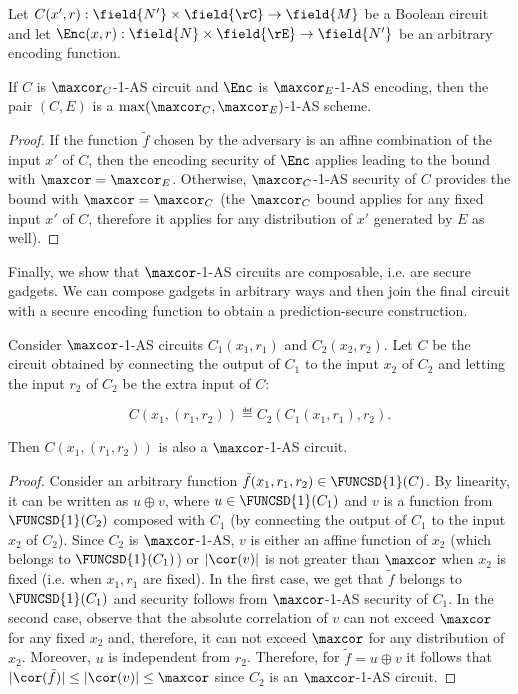 \begin{proposition}
Let $C(x',r): \field{N'} \times \field{\rC} \to \field{M}$ be a Boolean circuit and
let $\Enc(x,r): \field{N} \times \field{\rE} \to \field{N'}$ be an arbitrary encoding function.

If $C$ is $\maxcor_C$-1-AS circuit and $\Enc$ is $\maxcor_E$-1-AS encoding, then the pair $(C, E)$ is a $\max(\maxcor_C,\maxcor_E)$-1-AS scheme.
\end{proposition}
\begin{proof}
    If the function $\tilde{f}$ chosen by the adversary is an affine combination of the input $x'$ of $C$, then the encoding security of $\Enc$ applies leading to the bound with $\maxcor=\maxcor_E$. Otherwise, $\maxcor_C$-1-AS security of $C$ provides the bound with $\maxcor=\maxcor_C$ (the $\maxcor_C$ bound applies for any fixed input $x'$ of $C$, therefore it applies for any distribution of $x'$ generated by $E$ as well).
\end{proof}

Finally, we show that $\maxcor$-1-AS circuits are composable, i.e. are secure gadgets. We can compose gadgets in arbitrary ways and then join the final circuit with a secure encoding function to obtain a prediction-secure construction.

\begin{proposition}
Consider $\maxcor$-1-AS circuits $C_1(x_1, r_1)$ and $C_2(x_2, r_2)$. Let $C$ be the circuit obtained by connecting the output of $C_1$ to the input $x_2$ of $C_2$ and letting the input $r_2$ of $C_2$ be the extra input of $C$:

$$
C(x_1, (r_1, r_2)) \eqdef C_2(C_1(x_1, r_1), r_2).
$$

Then $C(x_1, (r_1, r_2))$ is also a $\maxcor$-1-AS circuit.
\end{proposition}
\begin{proof}
Consider an arbitrary function $\tilde{f}(x_1,r_1,r_2) \in \FUNCSD{1}(C)$. By linearity, it can be written as $u \oplus v$, where $u \in \FUNCSD{1}(C_1)$ and $v$ is a function from $\FUNCSD{1}(C_2)$ composed with $C_1$ (by connecting the output of $C_1$ to the input $x_2$ of $C_2$). Since $C_2$ is $\maxcor$-1-AS, $v$ is either an affine function of $x_2$ (which belongs to $\FUNCSD{1}(C_1)$) or $|\cor(v)|$ is not greater than $\maxcor$ when $x_2$ is fixed (i.e. when $x_1,r_1$ are fixed). In the first case, we get that $\tilde{f}$ belongs to $\FUNCSD{1}(C_1)$ and security follows from $\maxcor$-1-AS security of $C_1$. In the second case, observe that the absolute  correlation of $v$ can not exceed $\maxcor$ for any fixed $x_2$ and, therefore, it can not exceed $\maxcor$ for any distribution of $x_2$. Moreover, $u$ is independent from $r_2$. Therefore, for $\tilde{f} = u \oplus v$ it follows
that $|\cor(\tilde{f})| \le |\cor(v)| \le \maxcor$ since $C_2$ is an $\maxcor$-1-AS circuit.
\end{proof}

